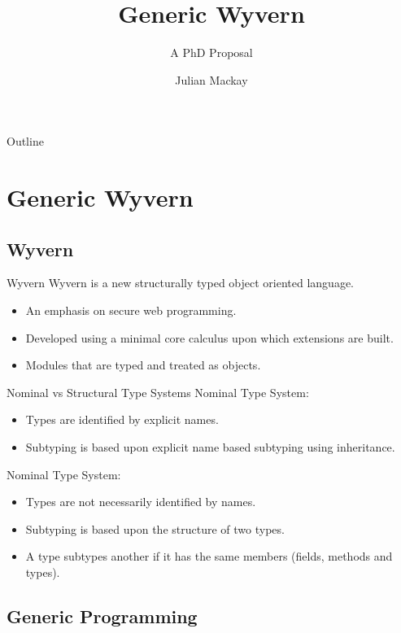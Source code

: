 \documentclass[dvipsnames]{beamer}
\title{Generic Wyvern}
\subtitle{A PhD Proposal}
\author{Julian Mackay}
\institute[VUW] %
{
  School of Engineering and Computer Science\\
  Victoria University of Wellington
  }
\date{}
\begin{document}
\begin{frame}
  \titlepage
\end{frame}

\begin{frame}{Outline}
  \tableofcontents[pausesections]
\end{frame}

\section{Generic Wyvern}

\subsection{Wyvern}

\begin{frame}{Wyvern}
Wyvern is a new structurally typed object oriented language.
\begin{itemize}
\item
An emphasis on secure web programming.
\item
Developed using a minimal core calculus upon which extensions are built.
\item
Modules that are typed and treated as objects.
\end{itemize}
\end{frame}

\begin{frame}{Nominal vs Structural Type Systems}
Nominal Type System:
\begin{itemize}
\item
Types are identified by explicit names.
\item
Subtyping is based upon explicit name based subtyping using inheritance.
\end{itemize}
Nominal Type System:
\begin{itemize}
\item
Types are not necessarily identified by names.
\item
Subtyping is based upon the structure of two types.
\item
A type subtypes another if it has the same members (fields, methods and types).
\end{itemize}
\end{frame}

\subsection{Generic Programming}
\end{document}
